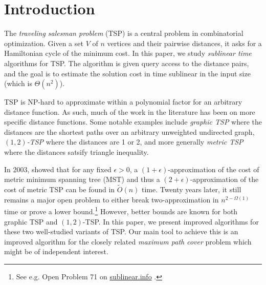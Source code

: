 \section{Introduction}

The {\em traveling salesman problem} (TSP) is a central problem in combinatorial optimization. Given a set $V$ of $n$ vertices and their pairwise distances, it asks for a Hamiltonian cycle of the minimum cost. In this paper, we study {\em sublinear time} algorithms for TSP. The algorithm is given query access to the distance pairs, and the goal is to estimate the solution cost in time sublinear in the input size (which is $\Theta(n^2)$).

TSP is NP-hard to approximate within a polynomial factor for an arbitrary distance function. As such, much of the work in the literature has been on more specific distance functions. Some notable examples include {\em graphic TSP} \cite{GharanSS11,MomkeS11,Mucha12,SeboV14,chen2020} where the distances are the shortest paths over an arbitrary unweighted undirected graph, {\em $(1, 2)$-TSP} \cite{AdamaszekMP18,chen2020,BermanK06,karp1972reducibility,MnichM18} where the distances are 1 or 2, and more generally {\em metric TSP} \cite{KarlinKG21,CzumajS-SIAM09,christofides1976worst,serdyukov1978nekotorykh} where the distances satsify triangle inequality. 

In 2003, \citet*{CzumajS-STOC04,CzumajS-SIAM09} showed that for any fixed $\epsilon > 0$, a $(1+\epsilon)$-approximation of the cost of metric minimum spanning tree (MST) and thus a  $(2+\epsilon)$-approximation of the cost of metric TSP can be found in $\widetilde{O}(n)$ time. Twenty years later, it still remains a major open problem to either break two-approximation in $n^{2-\Omega(1)}$ time or prove a lower bound.\footnote{See e.g. Open Problem 71 on \href{https://sublinear.info/index.php?title=Open_Problems:71}{sublinear.info} \cite{sublinear-info}.}
However, better bounds are known for both graphic TSP and $(1,2)$-TSP. In this paper, we present improved algorithms for these two well-studied variants of TSP. Our main tool to achieve this is an improved algorithm for the closely related {\em maximum path cover} problem which might be of independent interest.





\vspace{-0.2cm}
